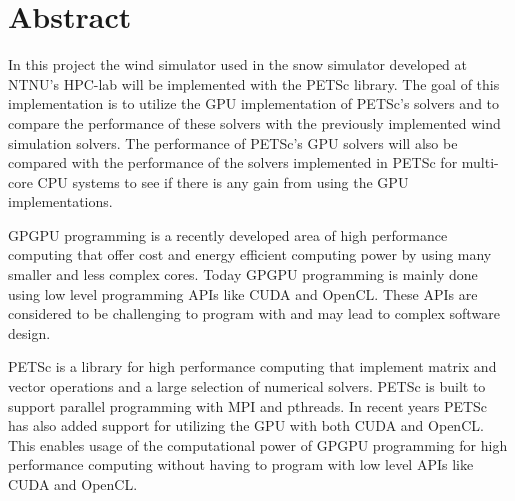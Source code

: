 \section*{Abstract}

In this project the wind simulator used in the snow simulator developed at
NTNU's HPC-lab will be implemented with the PETSc library. The goal of this
implementation is to utilize the GPU implementation of PETSc's solvers and to
compare the performance of these solvers with the previously implemented wind
simulation solvers. The performance of PETSc's GPU solvers will also be compared
with the performance of the solvers implemented in PETSc for multi-core CPU
systems to see if there is any gain from using the GPU implementations.

GPGPU programming is a recently developed area of high performance computing that
offer cost and energy efficient computing power by using many smaller and less
complex cores. Today GPGPU programming is mainly done using low level programming
APIs like CUDA and OpenCL. These APIs are considered to be challenging to
program with and may lead to complex software design.

PETSc is a library for high performance computing that implement matrix and vector
operations and a large selection of numerical solvers. PETSc is built to support
parallel programming with MPI and pthreads. In recent years PETSc has also added
support for utilizing the GPU with both CUDA and OpenCL. This enables usage of the
computational power of GPGPU programming for high performance
computing without having to program with low level APIs like CUDA and OpenCL.
